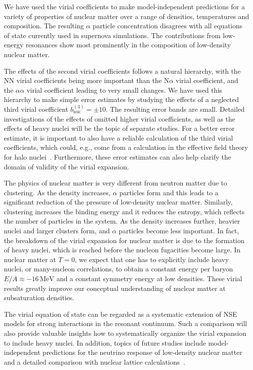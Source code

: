 \documentclass[aps,prc,twocolumn,showpacs,showkeys,amsmath,amssymb]{revtex4}
\newcommand{\mev}{\, \text{MeV}}
\begin{document}
We have used the virial coefficients to make model-independent
predictions for a variety of properties of nuclear matter over
a range of densities, temperatures and composition. The
resulting $\alpha$ particle concentration disagrees with all
equations of state currently used in supernova simulations.
The contributions from low-energy resonances show most prominently 
in the composition of low-density nuclear matter.

The effects of the 
second virial coefficients follows a natural hierarchy, with the 
NN virial coefficients being more important than the N$\alpha$ 
virial coefficient, and the $\alpha\alpha$ virial coefficient
leading to very small changes. We have used this hierarchy
to make simple error estimates by studying the effects of a
neglected third virial coefficient $b_{\text{nuc}}^{(3)}=\pm 10$.
The resulting error bands are small. Detailed
investigations of the effects of omitted higher virial 
coefficients, as well as the effects of heavy nuclei will be
the topic of separate studies. For a better error estimate, it 
is important to also have a reliable calculation of the
third virial coefficients, which could, e.g., come from a
calculation in the effective field theory for halo nuclei~\cite{haloEFT}.
Furthermore, these error estimates can also help clarify the domain 
of validity of the virial expansion.

The physics of nuclear matter is very different from neutron
matter due to clustering. As the density increases, $\alpha$ 
particles form and this leads to a significant reduction of the 
pressure of low-density nuclear matter. Similarly, clustering 
increases the binding energy and it reduces the entropy, which 
reflects the number of particles in the system. As the density
increases further, heavier nuclei and larger clusters form, and
$\alpha$ particles become less important. In fact, the breakdown
of the virial expansion for nuclear matter is due to the formation
of heavy nuclei, which is reached before the nucleon fugacities 
become large. In nuclear matter at $T=0$, we expect that one 
has to explicitly include heavy nuclei, or many-nucleon correlations, 
to obtain a constant energy per baryon $E/A \approx -16 \mev$ and 
a constant symmetry energy at low densities. These virial results
greatly improve our conceptual understanding of nuclear matter at
subsaturation densities. 

The virial equation of state can be regarded as a systematic 
extension of NSE models for strong interactions in the resonant 
continuum. Such a comparison will also provide valuable insights
how to systematically organize the virial expansion to include
heavy nuclei. In addition, topics of future studies include
model-independent predictions for the neutrino response of
low-density nuclear matter and a detailed comparison with 
nuclear lattice calculations~\cite{Sfact}.
\end{document}
